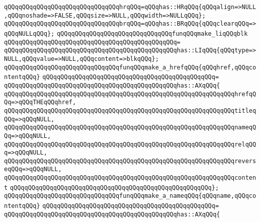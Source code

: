\newline
\verb|qQQqqQQqqQQqqQQqqQQqqQQqqQQqqQQqhrqQQq=qQQqhas::HRqQQq{qQQqalign=>NULL,qQQqnoshade=>FALSE,qQQqsize=>NULL,qQQqwidth=>NULLqQQq};|\newline
\newline
\verb|qQQqqQQqqQQqqQQqqQQqqQQqqQQqqQQqbrqQQq=qQQqhas::BRqQQq{qQQqclearqQQq=>qQQqNULLqQQq};|\newline
\newline
\verb|qQQqqQQqqQQqqQQqqQQqqQQqqQQqqQQqfunqQQqmake_liqQQqblk|\newline
\verb|qQQqqQQqqQQqqQQqqQQqqQQqqQQqqQQqqQQqqQQqqQQqqQQq=|\newline
\verb|qQQqqQQqqQQqqQQqqQQqqQQqqQQqqQQqqQQqqQQqqQQqqQQqhas::LIqQQq{qQQqtype=>NULL,qQQqvalue=>NULL,qQQqcontent=>blkqQQq};|\newline
\newline
\verb|qQQqqQQqqQQqqQQqqQQqqQQqqQQqqQQqfunqQQqmake_a_hrefqQQq{qQQqhref,qQQqcontentqQQq}|\newline
\verb|qQQqqQQqqQQqqQQqqQQqqQQqqQQqqQQqqQQqqQQqqQQqqQQq=|\newline
\verb|qQQqqQQqqQQqqQQqqQQqqQQqqQQqqQQqqQQqqQQqqQQqqQQqhas::AXqQQq{|\newline
\verb|qQQqqQQqqQQqqQQqqQQqqQQqqQQqqQQqqQQqqQQqqQQqqQQqqQQqqQQqqQQqqQQqhrefqQQq=>qQQqTHEqQQqhref,|\newline
\verb|qQQqqQQqqQQqqQQqqQQqqQQqqQQqqQQqqQQqqQQqqQQqqQQqqQQqqQQqqQQqqQQqtitleqQQq=>qQQqNULL,|\newline
\verb|qQQqqQQqqQQqqQQqqQQqqQQqqQQqqQQqqQQqqQQqqQQqqQQqqQQqqQQqqQQqqQQqnameqQQq=>qQQqNULL,|\newline
\verb|qQQqqQQqqQQqqQQqqQQqqQQqqQQqqQQqqQQqqQQqqQQqqQQqqQQqqQQqqQQqqQQqrelqQQq=>qQQqNULL,|\newline
\verb|qQQqqQQqqQQqqQQqqQQqqQQqqQQqqQQqqQQqqQQqqQQqqQQqqQQqqQQqqQQqqQQqreverseqQQq=>qQQqNULL,|\newline
\verb|qQQqqQQqqQQqqQQqqQQqqQQqqQQqqQQqqQQqqQQqqQQqqQQqqQQqqQQqqQQqqQQqcontent|\newline
\verb|qQQqqQQqqQQqqQQqqQQqqQQqqQQqqQQqqQQqqQQqqQQqqQQqqQQqqQQq};|\newline
\newline
\verb|qQQqqQQqqQQqqQQqqQQqqQQqqQQqqQQqfunqQQqmake_a_nameqQQq{qQQqname,qQQqcontentqQQq}|\newline
\verb|qQQqqQQqqQQqqQQqqQQqqQQqqQQqqQQqqQQqqQQqqQQqqQQq=|\newline
\verb|qQQqqQQqqQQqqQQqqQQqqQQqqQQqqQQqqQQqqQQqqQQqqQQqhas::AXqQQq{|\newline
